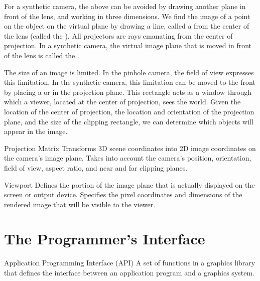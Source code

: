 \documentclass[../COS3712_Notes.tex]{subfiles}
\begin{document}
      For a synthetic camera, the above can be avoided by
      drawing another plane in front of the lens, and
      working in three dimensions.
      We find the image of a point on the object on the virtual plane
      by drawing a line, called a 
      from the center of the lens (called the ).
      All projectors are rays emanating from the center of projection.
      In a synthetic camera, the virtual image plane that is moved in front of the lens
      is called the .

      The size of an image is limited.
      In the pinhole camera, the field of view expresses this limitation.
      In the synthetic camera, this limitation can be moved to the front by
      placing a  or 
      in the projection plane.
      This rectangle acts as a window through which a viewer,
      located at the center of projection,
      sees the world.
      Given the location of the center of projection,
      the location and orientation of the projection plane, and
      the size of the clipping rectangle,
      we can determine which objects will appear in the image.

      \begin{definition}{Projection Matrix}
        Transforms 3D scene coordinates into 2D image coordinates on the camera's image plane.
        Takes into account the camera's position, orientation, field of view, aspect ratio,
        and near and far clipping planes.
      \end{definition}

      \begin{definition}{Viewport}
        Defines the portion of the image plane that is actually displayed on the screen or output
        device.
        Specifies the pixel coordinates and dimensions of the rendered image that will be visible
        to the viewer.
      \end{definition}

    \section{The Programmer's Interface}
      \begin{definition}{Application Programming Interface (API)}
        A set of functions in a graphics library that defines the interface
        between an application program and a graphics system.
      \end{definition}
\end{document}
